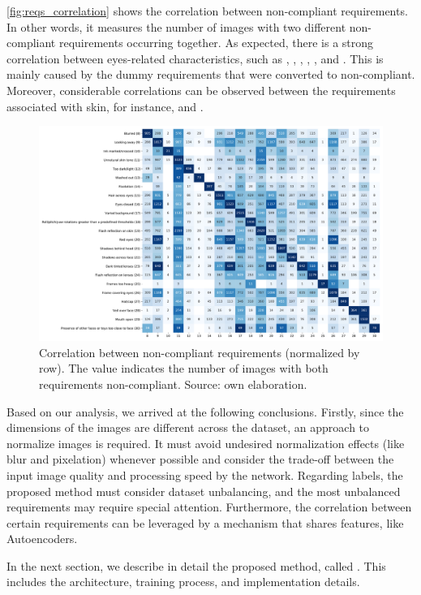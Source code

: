 \autoref{fig:reqs_correlation} shows the correlation between non-compliant requirements. In other words, it measures the number of images with two different non-compliant requirements occurring together. As expected, there is a strong correlation between eyes-related characteristics, such as \lookingaway, \hairacrosseyes, \eyesclosed, \redeyes, \darktintedlenses, and \framecoveringeyes. This is mainly caused by the dummy requirements that were converted to non-compliant. Moreover, considerable correlations can be observed between the requirements associated with skin, for instance, \unnaturalskintone and \flashskin. 
 
\begin{figure}[tb]
\centering
\includegraphics[width=\linewidth]{images/reqs/reqs_correlation.pdf}
\caption{Correlation between non-compliant requirements (normalized by row). The value indicates the number of images with both requirements non-compliant. Source: own elaboration.}
\label{fig:reqs_correlation}
\end{figure}
 
Based on our analysis, we arrived at the following conclusions. Firstly, since the dimensions of the images are different across the dataset, an approach to normalize images is required. It must avoid undesired normalization effects (like blur and pixelation) whenever possible and consider the trade-off between the input image quality and processing speed by the network. Regarding labels, the proposed method must consider dataset unbalancing, and the most unbalanced requirements may require special attention. Furthermore, the correlation between certain requirements can be leveraged by a mechanism that shares features, like Autoencoders.
 
In the next section, we describe in detail the proposed method, called \methodname. This includes the architecture, training process, and implementation details.
 
